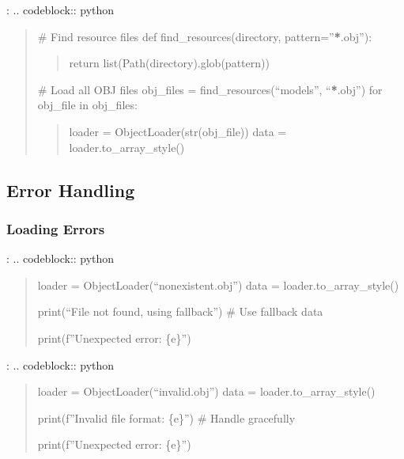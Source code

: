 \documentclass[a4paper,10pt,english,openany,oneside]{sphinxmanual}
\begin{document}
\sphinxAtStartPar
{}:
.. code\sphinxhyphen{}block:: python
\begin{quote}

\sphinxAtStartPar
\# Find resource files
def find\_resources(directory, pattern=”{\color{red}\bfseries{}*}.obj”):
\begin{quote}

\sphinxAtStartPar
return list(Path(directory).glob(pattern))
\end{quote}

\sphinxAtStartPar
\# Load all OBJ files
obj\_files = find\_resources(“models”, “{\color{red}\bfseries{}*}.obj”)
for obj\_file in obj\_files:
\begin{quote}

\sphinxAtStartPar
loader = ObjectLoader(str(obj\_file))
data = loader.to\_array\_style()
\end{quote}
\end{quote}


\subsection{Error Handling}
\label{\detokenize{api/utils:error-handling}}

\subsubsection{Loading Errors}
\label{\detokenize{api/utils:loading-errors}}
\sphinxAtStartPar
{}:
.. code\sphinxhyphen{}block:: python
\begin{quote}
\begin{description}
\sphinxAtStartPar
loader = ObjectLoader(“nonexistent.obj”)
data = loader.to\_array\_style()

\sphinxAtStartPar
print(“File not found, using fallback”)
\# Use fallback data

\sphinxAtStartPar
print(f”Unexpected error: \{e\}”)

\end{description}
\end{quote}

\sphinxAtStartPar
{}:
.. code\sphinxhyphen{}block:: python
\begin{quote}
\begin{description}
\sphinxAtStartPar
loader = ObjectLoader(“invalid.obj”)
data = loader.to\_array\_style()

\sphinxAtStartPar
print(f”Invalid file format: \{e\}”)
\# Handle gracefully

\sphinxAtStartPar
print(f”Unexpected error: \{e\}”)

\end{description}
\end{quote}
\end{document}
